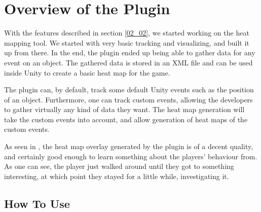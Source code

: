 \section{Overview of the Plugin}
\label{03}

With the features described in section \ref{02_02}, we started working on the heat mapping tool. We started with very basic tracking and visualizing, and built it up from there. In the end, the plugin ended up being able to gather data for any event on an object. The gathered data is stored in an XML file and can be used inside Unity to create a basic heat map for the game.

The plugin can, by default, track some default Unity events such as the position of an object. Furthermore, one can track custom events, allowing the developers to gather virtually any kind of data they want. The heat map generation will take the custom events into account, and allow generation of heat maps of the custom events.

As seen in , the heat map overlay generated by the plugin is of a decent quality, and certainly good enough to learn something about the players' behaviour from. As one can see, the player just walked around until they got to something interesting, at which point they stayed for a little while, investigating it.


\subsection{How To Use}
\label{03_01}

